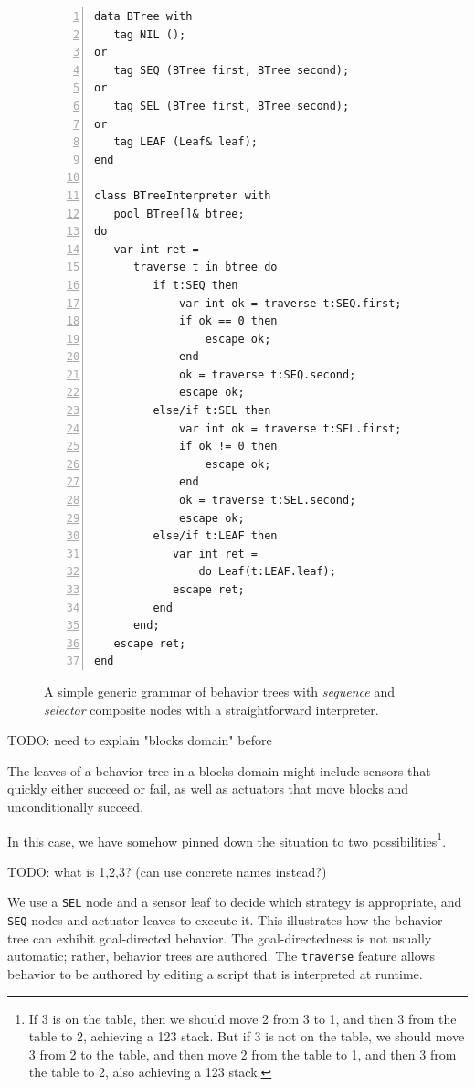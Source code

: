 \documentclass{sig-alternate}
\newcommand{\code}[1] {{\small{\texttt{#1}}}}
\begin{document}
\begin{figure}[t]
\begin{lstlisting}[numbers=left,xleftmargin=3em]
data BTree with
   tag NIL ();
or
   tag SEQ (BTree first, BTree second);
or
   tag SEL (BTree first, BTree second);
or
   tag LEAF (Leaf& leaf);
end

class BTreeInterpreter with
   pool BTree[]& btree;
do
   var int ret =
      traverse t in btree do
         if t:SEQ then
             var int ok = traverse t:SEQ.first;
             if ok == 0 then
                 escape ok;
             end
             ok = traverse t:SEQ.second;
             escape ok;
         else/if t:SEL then
             var int ok = traverse t:SEL.first;
             if ok != 0 then
                 escape ok;
             end
             ok = traverse t:SEL.second;
             escape ok;
         else/if t:LEAF then
            var int ret =
                do Leaf(t:LEAF.leaf);
            escape ret;
         end
      end;
   escape ret;
end
\end{lstlisting}
\caption{
A simple generic grammar of behavior trees with \emph{sequence} and 
\emph{selector} composite nodes with a straightforward interpreter.
\label{lst.bt1}
}
\end{figure}

TODO: need to explain "blocks domain" before

The leaves of a behavior tree in a blocks domain
might include sensors that quickly either succeed or fail,
as well as actuators that move blocks and unconditionally succeed.

In this case, we have somehow pinned down the
situation to two possibilities\footnote{If 3 is on the table,
then we should move 2 from 3 to 1,
and then 3 from the table to 2,
achieving a 123 stack.
But if 3 is not on the table,
we should move 3 from 2 to the table,
and then move 2 from the table to 1,
and then 3 from the table to 2,
also achieving a 123 stack.}.

TODO: what is 1,2,3? (can use concrete names instead?)

We use a \code{SEL} node and a sensor leaf to decide which strategy is appropriate,
and \code{SEQ} nodes and actuator leaves to execute it.
This illustrates how the behavior tree can exhibit goal-directed behavior.
The goal-directedness is not usually automatic; rather, behavior trees are authored.
The \code{traverse} feature allows behavior to be authored by 
editing a script that is interpreted at runtime.
\end{document}
